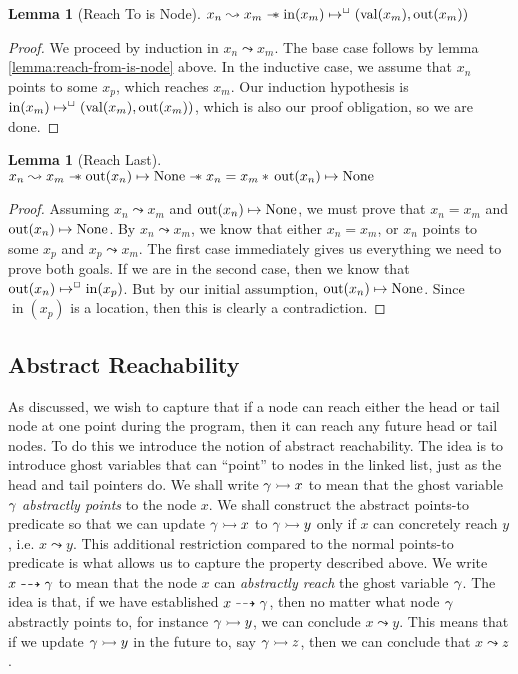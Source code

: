 \documentclass[a4paper, 10pt]{report}
\theoremstyle{definition}
\newtheorem{lemma}[theorem]{Lemma}
\newcommand{\nIn}[1]{\operatorname{in}(#1)}
\newcommand{\nVal}[1]{\operatorname{val}(#1)}
\newcommand{\nOut}[1]{\operatorname{out}(#1)}
\newcommand{\node}{x}
\newcommand{\nodeM}[1]{\node_{#1}}
\newcommand{\isNode}[1]{\nIn{#1} \mapsto^{\persistently} (\nVal{#1}, \nOut{#1})}
\newcommand{\reach}[2]{#1 \leadsto #2}
\newcommand{\ar}[2]{#1 \dashrightarrow #2}
\newcommand{\ap}[2]{#1 \rightarrowtail #2}
\begin{document}
\begin{lemma}[Reach To is Node]\label{lemma:reach-to-is-node}
  $\reach{\nodeM{n}}{\nodeM{m}} \wand \isNode{\nodeM{m}}$
\end{lemma}
\begin{proof}
  We proceed by induction in $\reach{\nodeM{n}}{\nodeM{m}}$. The base case follows by lemma \ref{lemma:reach-from-is-node} above. In the inductive case, we assume that $\nodeM{n}$ points to some $\nodeM{p}$, which reaches $\nodeM{m}$. Our induction hypothesis is $\isNode{\nodeM{m}}$, which is also our proof obligation, so we are done.
\end{proof}

\begin{lemma}[Reach Last]\label{lemma:reach-last}
  $\reach{\nodeM{n}}{\nodeM{m}} \wand \nOut{\nodeM{n}} \mapsto \None \wand \nodeM{n} = \nodeM{m} \star{} \nOut{\nodeM{n}} \mapsto \None$
\end{lemma}
\begin{proof}
  Assuming $\reach{\nodeM{n}}{\nodeM{m}}$ and $\nOut{\nodeM{n}} \mapsto \None$, we must prove that $\nodeM{n} = \nodeM{m}$ and $\nOut{\nodeM{n}} \mapsto \None$.
  By $\reach{\nodeM{n}}{\nodeM{m}}$, we know that either $\nodeM{n} = \nodeM{m}$, or $\nodeM{n}$ points to some $\nodeM{p}$ and $\reach{\nodeM{p}}{\nodeM{m}}$. The first case immediately gives us everything we need to prove both goals. If we are in the second case, then we know that $\nOut{\nodeM{n}} \mapsto^{\persistently} \nIn{\nodeM{p}}$. But by our initial assumption, $\nOut{\nodeM{n}} \mapsto \None$. Since $\nIn{\nodeM{p}}$ is a location, then this is clearly a contradiction.
\end{proof}


\subsection{Abstract Reachability}

As discussed, we wish to capture that if a node can reach either the head or tail node at one point during the program, then it can reach any future head or tail nodes. To do this we introduce the notion of abstract reachability. The idea is to introduce ghost variables that can ``point'' to nodes in the linked list, just as the head and tail pointers do. We shall write $\ap{\gname}{x}$ to mean that the ghost variable $\gamma$ \emph{abstractly points} to the node $x$. We shall construct the abstract points-to predicate so that we can update $\ap{\gname}{x}$ to $\ap{\gname}{y}$ only if $x$ can concretely reach $y$, i.e. $\reach{x}{y}$. This additional restriction compared to the normal points-to predicate is what allows us to capture the property described above. We write $\ar{x}{\gname}$ to mean that the node $x$ can \emph{abstractly reach} the ghost variable $\gamma$. The idea is that, if we have established $\ar{x}{\gname}$, then no matter what node $\gamma$ abstractly points to, for instance $\ap{\gname}{y}$, we can conclude $\reach{x}{y}$. This means that if we update $\ap{\gname}{y}$ in the future to, say $\ap{\gname}{z}$, then we can conclude that $\reach{x}{z}$.
\end{document}
